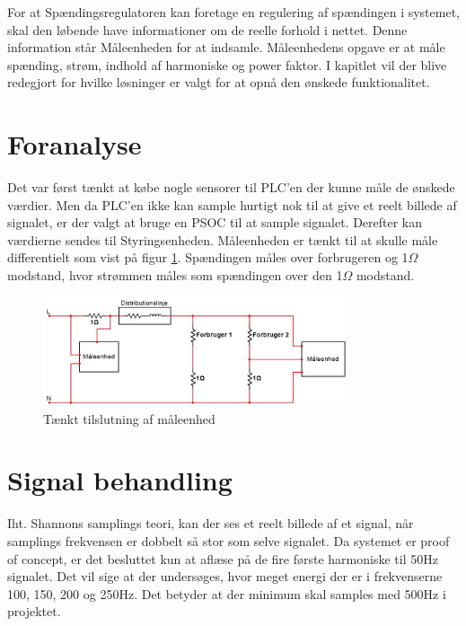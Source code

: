
For at Spændingsregulatoren kan foretage en regulering af spændingen i systemet, skal den løbende have informationer om de reelle forhold i nettet. Denne information står Måleenheden for at indsamle. Måleenhedens opgave er at måle spænding, strøm, indhold af harmoniske og power faktor. I kapitlet vil der blive redegjort for hvilke løsninger er valgt for at opnå den ønskede funktionalitet. 

\section{Foranalyse}
Det var først tænkt at købe nogle sensorer til PLC'en der kunne måle de ønskede værdier. Men da PLC'en ikke kan sample hurtigt nok til at give et reelt billede af signalet, er der valgt at bruge en PSOC til at sample signalet. Derefter kan værdierne sendes til Styringsenheden. Måleenheden er tænkt til at skulle måle differentielt som vist på figur \ref{fig:MaalForanalyse}. Spændingen måles over forbrugeren og 1$\Omega$ modstand, hvor strømmen måles som spændingen over den 1$\Omega$ modstand.

\begin{figure}[H] %
	\centering
	\includegraphics[width=0.8\textwidth]{figure/MaalForanalyse}
	\caption{Tænkt tilslutning af måleenhed}
	\label{fig:MaalForanalyse}
\end{figure}

\section{Signal behandling}

Iht. Shannons samplings teori\cite{Shannon}, kan der ses et reelt billede af et signal, når samplings frekvensen er dobbelt så stor som selve signalet. Da systemet er proof of concept, er det besluttet kun at aflæse på de fire første harmoniske til 50Hz signalet. Det vil sige at der undersøges, hvor meget energi der er i frekvenserne 100, 150, 200 og 250Hz. Det betyder at der minimum skal samples med 500Hz i projektet.

